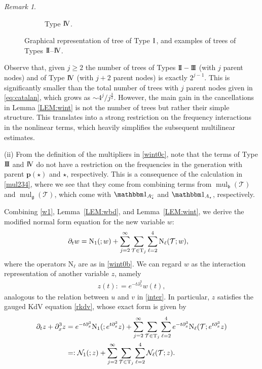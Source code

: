 \documentclass[a4paper,
11pt,  reqno]{amsart}
\makeatletter
\newcommand{\I}{\hspace{0.2mm}\textup{I}\hspace{0.2mm}}
\newcommand{\II}{\textup{I \hspace{-2.9mm} I} }
\newcommand{\III}{\textup{I \hspace{-2.9mm} I \hspace{-2.9mm} I}}
\newcommand{\IV}{\textup{I \hspace{-2.9mm} V}}
\newcommand{\5}{\textup{V}}
\newcommand{\noi}{\noindent}
\newcommand{\ind}{\mathbbm 1}
\newcommand{\dx}{\partial_x}
\newcommand{\dt}{\partial_t}
\theoremstyle{remark}
\newtheorem{remark}[theorem]{Remark}
\newcommand{\TT}{\mathcal{T}}
\newcommand{\Tr}{\mathrm{T}}
\newcommand{\bfrak}{\mathfrak{b}}
\newcommand{\gfrak}{\mathfrak{g}}
\newcommand{\pb}{\mathbf{p}}
\renewcommand{\l}{\ell}
\DeclareMathOperator{\mul}{mul}
\def\<#1>{\csname MH@symb@#1\endcsname}
\numberwithin{equation}{section}
\numberwithin{theorem}{section}
\newcommand{\NN}{\mathrm{N}}
\newcommand{\Ncal}{\mathcal{N}}
\makeatother
\begin{document}
\begin{remark}
\begin{figure}[!h]
\begin{subfigure}[b]{0.2\textwidth}
\caption{Type $\IV$.}
\end{subfigure}
\caption{Graphical representation of tree of Type $\I$, and examples of trees of Types $\II$--$\IV$. }
\label{FIG:types}
\end{figure}
\noi Observe that, given $j\ge 2$ the number of trees of Types $\II-\III$ (with $j$ parent nodes) and of Type $\IV$ (with $j+2$ parent nodes) is exactly $2^{j-1}$. This is significantly smaller than the total number of trees with $j$ parent nodes given in \eqref{eq:catalan}, which grows as $\sim 4^j/j^{\frac32}$. However, the main gain in the cancellations in Lemma \ref{LEM:wint} is not the number of trees but rather their simple structure. This translates into a strong restriction on the frequency interactions in the nonlinear terms, which heavily simplifies the subsequent multilinear estimates.


\medskip

\noi (ii) From the definition of the multipliers in \eqref{wint0c}, note that the terms of Type $\III$ and $\IV$ do not have a restriction on the frequencies in the generation with parent $\pb(\star)$ and $\star$, respectively. This is a consequence of the calculation in \eqref{mul234}, where we see that they come from combining terms from $\mul_\bfrak(\TT)$ and $\mul_{\gfrak}(\TT)$, which come with $\ind_{A_{\star}^c} $ and $\ind_{A_\star}$, respectively.


\end{remark}


Combining \eqref{w1}, Lemma~\ref{LEM:wbd}, and Lemma~\ref{LEM:wint}, we derive the modified normal form equation for the new variable $w$:
\begin{align}
\label{w2}
\dt w & =  \NN_1(\<1>;w) + \sum_{j=2}^\infty \sum_{\TT \in \Tr_j} \sum_{\l=2}^4  \NN_\l(\TT;w),
\end{align}
where the operators $\NN_\l$ are as in \eqref{wint0b}.
We can regard $w$ as the interaction representation of another variable $z$, namely
\begin{align}
\label{z0}
z(t) : = e^{-t\dx^3} w(t),
\end{align}
analogous to the relation between $u$ and $v$ in \eqref{inter}. In particular, $z$ satisfies the gauged KdV equation \eqref{rkdv}, whose exact form is given by
\begin{align}
\label{z1}
\dt z
+ \dx^3 z
&
=
e^{-t\dx^3}
\NN_1(\<1>;e^{t\partial_x^3}z)
+
\sum_{j=2}^\infty \sum_{\TT \in \Tr_j} \sum_{\l=2}^4
e^{-t\dx^3}
\NN_\l(\TT;e^{t\partial_x^3}z)
\\
&
=:
\Ncal_1(\<1>;z) + \sum_{j=2}^\infty \sum_{\TT \in \Tr_j} \sum_{\l=2}^4  \Ncal_\l(\TT;z)
.
\end{align}
\end{document}
